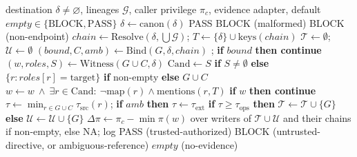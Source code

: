 \documentclass[applsci,article,submit,moreauthors]{Definitions/mdpi}
\begin{document}
\begin{algorithm}[!htb]
\caption{STPG realization of the decision kernel at a privileged routing call, with adapters and defaults as listed in Table~\ref{tab:adapters}}
\label{alg:gate}
\begin{algorithmic}[1]
\REQUIRE destination $\delta\neq\varnothing$, lineages $\mathcal{G}$, caller privilege $\pi_c$, evidence adapter, default $\mathit{empty}\in\{\mathrm{BLOCK},\mathrm{PASS}\}$
\STATE $\delta\leftarrow\mathrm{canon}(\delta)$ 
 \RETURN PASS \ENDIF
{} \RETURN BLOCK (malformed) \ENDIF
{} \RETURN BLOCK (non-endpoint) \ENDIF
\STATE $\mathit{chain}\leftarrow\mathrm{Resolve}(\delta,\bigcup\mathcal{G})$; $T\leftarrow\{\delta\}\cup\mathrm{keys}(\mathit{chain})$ 
\STATE $\mathcal{T}\leftarrow\emptyset$; $\mathcal{U}\leftarrow\emptyset$
  \STATE $(\mathit{bound},C,\mathit{amb})\leftarrow\mathrm{Bind}(G,\delta,\mathit{chain})$ ; \textbf{if} \NOT $\mathit{bound}$ \textbf{then continue}
  \STATE $(w,\mathit{roles},S)\leftarrow\mathrm{Witness}(G\cup C,\delta)$ 
  \STATE $\mathrm{Cand}\leftarrow S$ \textbf{if} $S\neq\emptyset$ \textbf{else} $\{r:\mathit{roles}[r]=\mathrm{target}\}$ \textbf{if} non-empty \textbf{else} $G\cup C$
  \STATE $w\leftarrow w\ \wedge\ \exists r\in\mathrm{Cand}:\ \neg\mathrm{map}(r)\wedge\mathrm{mentions}(r,T)$ 
  \STATE \textbf{if} \NOT $w$ \textbf{then continue}
  \STATE $\tau\leftarrow\min_{r\in G\cup C}\tau_{\mathrm{src}}(r)$; \textbf{if} $\mathit{amb}$ \textbf{then} $\tau\leftarrow\tau_{\mathrm{ext}}$
  \STATE \textbf{if} $\tau\ge\tau_{\mathrm{ops}}$ \textbf{then} $\mathcal{T}\leftarrow\mathcal{T}\cup\{G\}$ \textbf{else} $\mathcal{U}\leftarrow\mathcal{U}\cup\{G\}$
\ENDFOR
\STATE $\Delta\pi\leftarrow\pi_c-\min\pi(w)$ over writers of $\mathcal{T}\cup\mathcal{U}$ and their chains if non-empty, else NA; log
 \RETURN PASS (trusted-authorized) \ENDIF
{} \RETURN BLOCK (untrusted-directive, or ambiguous-reference) \ENDIF
\RETURN $\mathit{empty}$ (no-evidence)
\end{algorithmic}
\end{algorithm}
\end{document}
